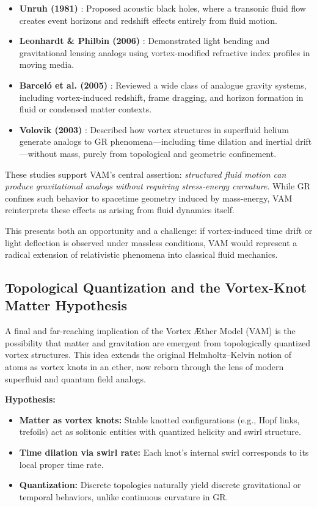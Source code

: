 \documentclass[a4paper, aps,preprint,superscriptaddress, 12pt]{revtex4}
\begin{document}
\begin{itemize}
    \item \textbf{Unruh (1981)} \cite{unruh1981}: Proposed acoustic black holes, where a transonic fluid flow creates event horizons and redshift effects entirely from fluid motion.

    \item \textbf{Leonhardt \& Philbin (2006)} \cite{leonhardt2006}: Demonstrated light bending and gravitational lensing analogs using vortex-modified refractive index profiles in moving media.

    \item \textbf{Barceló et al. (2005)} \cite{barcelo2005}: Reviewed a wide class of analogue gravity systems, including vortex-induced redshift, frame dragging, and horizon formation in fluid or condensed matter contexts.

    \item \textbf{Volovik (2003)} \cite{volovik2003}: Described how vortex structures in superfluid helium generate analogs to GR phenomena---including time dilation and inertial drift---without mass, purely from topological and geometric confinement.
\end{itemize}

These studies support VAM's central assertion: \emph{structured fluid motion can produce gravitational analogs without requiring stress-energy curvature}. While GR confines such behavior to spacetime geometry induced by mass-energy, VAM reinterprets these effects as arising from fluid dynamics itself.

This presents both an opportunity and a challenge: if vortex-induced time drift or light deflection is observed under massless conditions, VAM would represent a radical extension of relativistic phenomena into classical fluid mechanics.

\subsection{Topological Quantization and the Vortex-Knot Matter Hypothesis}

A final and far-reaching implication of the Vortex Æther Model (VAM) is the possibility that matter and gravitation are emergent from topologically quantized vortex structures. This idea extends the original Helmholtz–Kelvin notion of atoms as vortex knots in an ether, now reborn through the lens of modern superfluid and quantum field analogs.

\textbf{Hypothesis:}
\begin{itemize}
    \item \textbf{Matter as vortex knots:} Stable knotted configurations (e.g., Hopf links, trefoils) act as solitonic entities with quantized helicity and swirl structure.
    \item \textbf{Time dilation via swirl rate:} Each knot's internal swirl corresponds to its local proper time rate.
    \item \textbf{Quantization:} Discrete topologies naturally yield discrete gravitational or temporal behaviors, unlike continuous curvature in GR.
\end{itemize}
\end{document}

